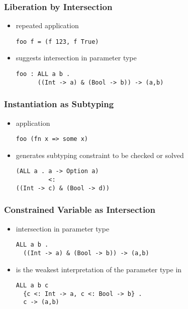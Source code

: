 \documentclass{beamer}
\begin{document}
\begin{frame}[fragile]
  \frametitle{Liberation by Intersection}

  \begin{itemize}
  \item repeated application
  \begin{lstlisting}
foo f = (f 123, f True)
  \end{lstlisting}
  \item suggests intersection in parameter type  
  \begin{lstlisting}
foo : ALL a b . 
      ((Int -> a) & (Bool -> b)) -> (a,b)
  \end{lstlisting}
  \end{itemize}
\end{frame}


\begin{frame}[fragile]
  \frametitle{Instantiation as Subtyping}

  \begin{itemize}
  \item application 
  \begin{lstlisting}
foo (fn x => some x)
  \end{lstlisting}
  \item generates subtyping constraint to be checked or solved 
  \begin{lstlisting}
(ALL a . a -> Option a) 
         <: 
((Int -> c) & (Bool -> d))
  \end{lstlisting}
  \end{itemize}
\end{frame}


\begin{frame}[fragile]
  \frametitle{Constrained Variable as Intersection}
  \begin{itemize}
  \item intersection in parameter type 
  \begin{lstlisting}
ALL a b . 
  ((Int -> a) & (Bool -> b)) -> (a,b)
  \end{lstlisting}
  \item is the weakest interpretation of the parameter type in 
  \begin{lstlisting}
ALL a b c 
  {c <: Int -> a, c <: Bool -> b} . 
  c -> (a,b)
  \end{lstlisting}
  \end{itemize}
\end{frame}
\end{document}
